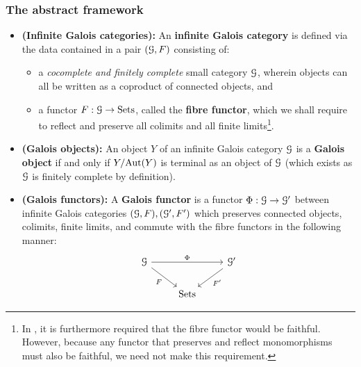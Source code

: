             \subsubsection{The abstract framework}
                \begin{definition} \label{def: infinite_galois_categories}
                    \noindent
                    \begin{itemize}
                        \item \textbf{(Infinite Galois categories):} An \textbf{infinite Galois category} is defined via the data contained in a pair $(\mathcal{G}, F)$ consisting of:
                        \begin{itemize}
                            \item a \textit{cocomplete and \textit{finitely} complete} small category $\mathcal{G}$, wherein objects can all be written as a coproduct of connected objects, and
                            \item a functor $F: \mathcal{G} \to \mathrm{Sets}$, called the \textbf{fibre functor}, which we shall require to reflect and preserve all colimits and all finite limits\footnote{In \cite[Definition 7.2.1]{bhatt_scholze_2014_pro_etale}, it is furthermore required that the fibre functor would be faithful. However, because any functor that preserves and reflect monomorphisms must also be faithful, we need not make this requirement.}.
                        \end{itemize}
                        \item \textbf{(Galois objects):} An object $Y$ of an infinite Galois category $\mathcal{G}$ is a \textbf{Galois object} if and only if $Y/\mathrm{Aut}(Y)$ is terminal as an object of $\mathcal{G}$ (which exists as $\mathcal{G}$ is finitely complete by definition).
                        \item \textbf{(Galois functors):} A \textbf{Galois functor} is a functor $\Phi: \mathcal{G} \to \mathcal{G}'$ between infinite Galois categories $(\mathcal{G}, F), (\mathcal{G}', F')$ which preserves connected objects, colimits, finite limits, and commute with the fibre functors in the following manner:
                            $$
                                \begin{tikzcd}
                                	\calG && {\calG'} \\
                                	& \Sets
                                	\arrow["F"', from=1-1, to=2-2]
                                	\arrow["{F'}", from=1-3, to=2-2]
                                	\arrow["\Phi", from=1-1, to=1-3]
                                \end{tikzcd}
                            $$
                    \end{itemize}
                \end{definition}    
